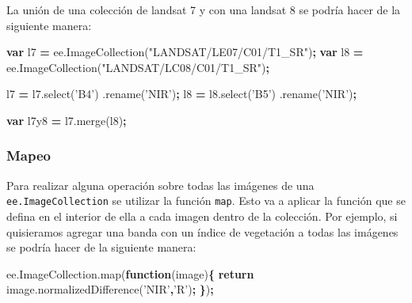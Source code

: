 \documentclass[
]{article}
\newenvironment{Shaded}{\begin{snugshade}}{\end{snugshade}}
\newcommand{\AttributeTok}[1]{\textcolor[rgb]{0.77,0.63,0.00}{#1}}
\newcommand{\ControlFlowTok}[1]{\textcolor[rgb]{0.13,0.29,0.53}{\textbf{#1}}}
\newcommand{\KeywordTok}[1]{\textcolor[rgb]{0.13,0.29,0.53}{\textbf{#1}}}
\newcommand{\NormalTok}[1]{#1}
\newcommand{\OperatorTok}[1]{\textcolor[rgb]{0.81,0.36,0.00}{\textbf{#1}}}
\newcommand{\StringTok}[1]{\textcolor[rgb]{0.31,0.60,0.02}{#1}}
\newcommand{\VariableTok}[1]{\textcolor[rgb]{0.00,0.00,0.00}{#1}}
\begin{document}
La unión de una colección de landsat 7 y con una landsat 8 se podría
hacer de la siguiente manera:

\begin{Shaded}
\begin{Highlighting}[]
\KeywordTok{var}\NormalTok{ l7 }\OperatorTok{=} \VariableTok{ee}\NormalTok{.}\AttributeTok{ImageCollection}\NormalTok{(}\StringTok{"LANDSAT/LE07/C01/T1_SR"}\NormalTok{)}\OperatorTok{;}
\KeywordTok{var}\NormalTok{ l8 }\OperatorTok{=} \VariableTok{ee}\NormalTok{.}\AttributeTok{ImageCollection}\NormalTok{(}\StringTok{"LANDSAT/LC08/C01/T1_SR"}\NormalTok{)}\OperatorTok{;}

\NormalTok{l7 }\OperatorTok{=} \VariableTok{l7}\NormalTok{.}\AttributeTok{select}\NormalTok{(}\StringTok{'B4'}\NormalTok{)}
\NormalTok{  .}\AttributeTok{rename}\NormalTok{(}\StringTok{'NIR'}\NormalTok{)}\OperatorTok{;}
\NormalTok{l8 }\OperatorTok{=} \VariableTok{l8}\NormalTok{.}\AttributeTok{select}\NormalTok{(}\StringTok{'B5'}\NormalTok{)}
\NormalTok{  .}\AttributeTok{rename}\NormalTok{(}\StringTok{'NIR'}\NormalTok{)}\OperatorTok{;}

\KeywordTok{var}\NormalTok{ l7y8 }\OperatorTok{=} \VariableTok{l7}\NormalTok{.}\AttributeTok{merge}\NormalTok{(l8)}\OperatorTok{;}
\end{Highlighting}
\end{Shaded}

\hypertarget{mapeo}{%
\subsubsection{Mapeo}\label{mapeo}}

Para realizar alguna operación sobre todas las imágenes de una
\texttt{ee.ImageCollection} se utilizar la función \texttt{map}. Esto va
a aplicar la función que se defina en el interior de ella a cada imagen
dentro de la colección. Por ejemplo, si quisieramos agregar una banda
con un índice de vegetación a todas las imágenes se podría hacer de la
siguiente manera:

\begin{Shaded}
\begin{Highlighting}[]
\VariableTok{ee}\NormalTok{.}\VariableTok{ImageCollection}\NormalTok{.}\AttributeTok{map}\NormalTok{(}\KeywordTok{function}\NormalTok{(image)}\OperatorTok{\{}
    \ControlFlowTok{return} \VariableTok{image}\NormalTok{.}\AttributeTok{normalizedDifference}\NormalTok{(}\StringTok{'NIR'}\OperatorTok{,}\StringTok{'R'}\NormalTok{)}\OperatorTok{;}
\OperatorTok{\}}\NormalTok{)}\OperatorTok{;}
\end{Highlighting}
\end{Shaded}
\end{document}
